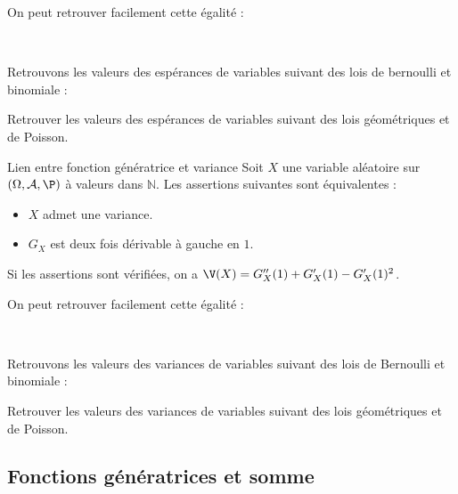 \documentclass[french,11pt,twoside]{VcCours}
\begin{document}
\begin{Remarque}{} On peut retrouver facilement cette égalité :

\vspace*{3cm}~
\end{Remarque}

\begin{Exemple}{} Retrouvons les valeurs des espérances de variables suivant des lois de bernoulli et binomiale :

\vspace*{5cm}
\end{Exemple}

\begin{ApplicationDirecte}{} Retrouver les valeurs des espérances de variables suivant des lois géométriques et de Poisson.
\end{ApplicationDirecte}

\begin{Proposition}{Lien entre fonction génératrice et variance} Soit $X$ une variable aléatoire sur $(\Omega, \mathcal{A}, \P)$ à valeurs dans $\mathbb{N}$. Les assertions suivantes sont équivalentes :

\begin{itemize}
\item $X$ admet une variance.
\item $G_X$ est deux fois dérivable à gauche en $1$.
\end{itemize}
Si les assertions sont vérifiées, on a $\V(X)=G_X''(1)+G_X'(1)-G_X'(1)^2$.
\end{Proposition}

\begin{Remarque}{} On peut retrouver facilement cette égalité :

\vspace*{4cm}~
\end{Remarque}

\begin{Exemple}{} Retrouvons les valeurs des variances de variables suivant des lois de Bernoulli et binomiale :

\vspace*{5cm}
\end{Exemple}

\begin{ApplicationDirecte}{} Retrouver les valeurs des variances de variables suivant des lois géométriques et de Poisson.
\end{ApplicationDirecte}

\subsection{Fonctions génératrices et somme}
\end{document}
